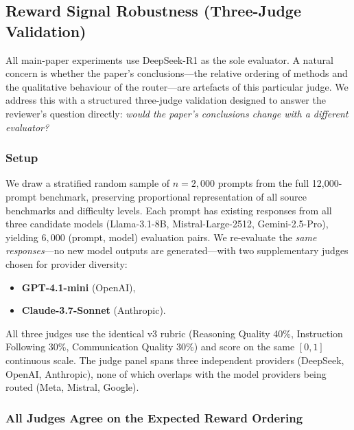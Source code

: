 
\subsection{Reward Signal Robustness (Three-Judge Validation)}
\label{sec:judge_robustness}

All main-paper experiments use DeepSeek-R1 as the sole evaluator.
A natural concern is whether the paper's conclusions---the relative
ordering of methods and the qualitative behaviour of the router---are
artefacts of this particular judge.  We address this with a structured
three-judge validation designed to answer the reviewer's question
directly: \emph{would the paper's conclusions change with a different
evaluator?}

\subsubsection{Setup}

We draw a stratified random sample of $n = 2{,}000$ prompts from the full
12{,}000-prompt benchmark, preserving proportional representation of all
source benchmarks and difficulty levels.  Each prompt has existing responses
from all three candidate models (Llama-3.1-8B, Mistral-Large-2512,
Gemini-2.5-Pro), yielding $6{,}000$ (prompt, model) evaluation pairs.  We
re-evaluate the \emph{same responses}---no new model outputs are
generated---with two supplementary judges chosen for provider diversity:

\begin{itemize}[leftmargin=*,noitemsep,topsep=0pt]
    \item \textbf{GPT-4.1-mini} (OpenAI),
    \item \textbf{Claude-3.7-Sonnet} (Anthropic).
\end{itemize}

\noindent All three judges use the identical v3 rubric (Reasoning Quality
40\%, Instruction Following 30\%, Communication Quality 30\%) and score on
the same $[0,1]$ continuous scale.  The judge panel spans three independent
providers (DeepSeek, OpenAI, Anthropic), none of which overlaps with the
model providers being routed (Meta, Mistral, Google).

\subsubsection{All Judges Agree on the Expected Reward Ordering}

